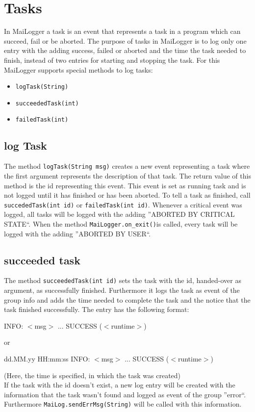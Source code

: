 \documentclass{article}
\begin{document}
\section{Tasks}
\label{tasks}
    In MaiLogger a task is an event that represents a task in a program which can succeed, fail or be aborted.
    The purpose of tasks in MaiLogger is to log only one entry with the adding success, failed or aborted and the time the task needed to finish, instead of two entries for starting and stopping the task.
    For this MaiLogger supports special methods to log tasks:
    \begin{itemize}
        \item \lstinline|logTask(String)|
        \item \lstinline|succeededTask(int)|
        \item \lstinline|failedTask(int)|
    \end{itemize}

    \subsection{log Task}
    \label{task_logTask}
    The method \lstinline|logTask(String msg)| creates a new event representing a task where the first argument represents the description of that task.
    The return value of this method is the id representing this event.
    This event is set as running task and is not logged until it has finished or has been aborted.
    To tell a task as finished, call \lstinline|succededTask(int id)| or \lstinline|failedTask(int id)|.
    Whenever a critical event was logged, all tasks will be logged with the adding ''ABORTED BY CRITICAL STATE``.
    When the method \lstinline|MaiLogger.on_exit()|is called, every task will be logged with the adding ''ABORTED BY USER``.

    \subsection{succeeded task}
    \label{task_succeededTask}
    The method \lstinline|succeededTask(int id)| sets the task with the id, handed-over as argument, as successfully finished.
    Furthermore it logs the task as event of the group info and adds the time needed to complete the task and the notice that the task finished successfully.
    The entry has the following format:
    \begin{description}
        \item INFO: $<$msg$>$ ... SUCCESS ($<$runtime$>$)
        \item or
        \item dd.MM.yy HH:mm:ss INFO: $<$msg$>$ ... SUCCESS ($<$runtime$>$)
    \end{description}
    (Here, the time is specified, in which the task was created) \\
    If the task with the id doesn't exist, a new log entry will be created with the information that the task wasn't found and logged as event of the group ''error``.
    Furthermore \lstinline|MaiLog.sendErrMsg(String)| will be called with this information.
\end{document}
